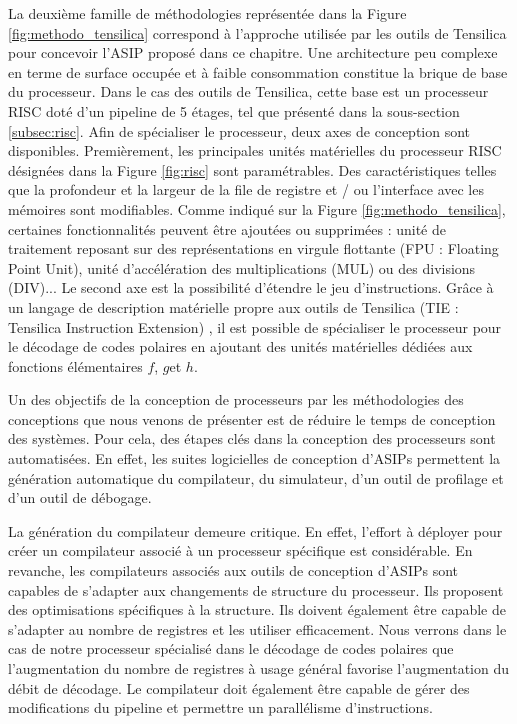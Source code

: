 La deuxième famille de méthodologies représentée dans la Figure \ref{fig:methodo_tensilica} correspond à l'approche utilisée par les outils de Tensilica pour concevoir l'ASIP proposé dans ce chapitre. Une architecture peu complexe en terme de surface occupée et à faible consommation constitue la brique de base du processeur. Dans le cas des outils de Tensilica, cette base est un processeur RISC doté d'un pipeline de 5 étages, tel que présenté dans la sous-section \ref{subsec:risc}. Afin de spécialiser le processeur, deux axes de conception sont disponibles. Premièrement, les principales unités matérielles du processeur RISC désignées dans la Figure \ref{fig:risc} sont paramétrables. Des caractéristiques telles que la profondeur et la largeur de la file de registre et / ou l'interface avec les mémoires sont modifiables. Comme indiqué sur la Figure \ref{fig:methodo_tensilica}, certaines fonctionnalités peuvent être ajoutées ou supprimées : unité de traitement reposant sur des représentations en virgule flottante (FPU : Floating Point Unit), unité d'accélération des multiplications (MUL) ou des divisions (DIV)... Le second axe est la possibilité d'étendre le jeu d'instructions. Grâce à un langage de description matérielle propre aux outils de Tensilica (TIE : Tensilica Instruction Extension) \cite{tie2017reference}, il est possible de spécialiser le processeur pour le décodage de codes polaires en ajoutant des unités matérielles dédiées aux fonctions élémentaires $f$, $g$et $h$.

Un des objectifs de la conception de processeurs par les méthodologies des conceptions que nous venons de présenter est de réduire le temps de conception des systèmes. Pour cela, des étapes clés dans la conception des processeurs sont automatisées. En effet, les suites logicielles de conception d'ASIPs permettent la génération automatique du compilateur, du simulateur, d'un outil de profilage et d'un outil de débogage. 

La génération du compilateur demeure critique. En effet, l'effort à déployer pour créer un compilateur associé à un processeur spécifique est considérable. En revanche, les compilateurs associés aux outils de conception d'ASIPs sont capables de s'adapter aux changements de structure du processeur. Ils proposent des optimisations spécifiques à la structure. Ils doivent également être capable de s'adapter au nombre de registres et les utiliser efficacement. Nous verrons dans le cas de notre processeur spécialisé dans le décodage de codes polaires que l'augmentation du nombre de registres à usage général favorise l'augmentation du débit de décodage. Le compilateur doit également être capable de gérer des modifications du pipeline et permettre un parallélisme d'instructions.

